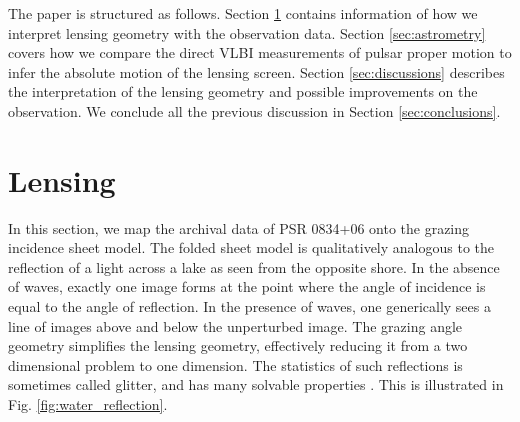 \documentclass[useAMS,usenatbib]{mn2e}
\begin{document}
The paper is structured as follows. Section \ref{sec:lensing} contains information of how we interpret lensing geometry with the observation data.  
Section \ref{sec:astrometry} covers how we compare the direct VLBI measurements of pulsar proper motion to infer the absolute motion of the lensing screen.  
Section \ref{sec:discussions} describes the interpretation of the lensing geometry and possible improvements on the observation.  
We conclude all the previous discussion in Section \ref{sec:conclusions}.




\section{Lensing}
\label{sec:lensing}
In this section, we map the archival data of PSR 0834+06 onto the grazing incidence sheet
model.  The folded sheet model is qualitatively analogous to the
reflection of a light across a lake as seen from the opposite
shore.
In the absence of waves, exactly one image forms at the point
where the angle of incidence is equal to the angle of reflection.  In
the presence of waves, one generically sees a line of images above and
below the unperturbed image.  The grazing angle geometry simplifies
the lensing geometry, effectively reducing it from a two dimensional problem to
one dimension.  The statistics of such reflections is sometimes called
glitter, and has many solvable
properties \citep{LonguetHiggins1960}.  This is illustrated in
Fig. \ref{fig:water_reflection}.


\end{document}
